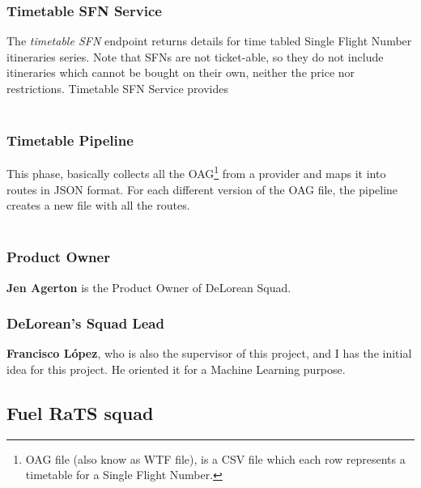 \subsubsection{Timetable SFN Service} \label{timetable_sfn_service}

The \textit{timetable SFN} endpoint returns details for time tabled Single Flight Number itineraries series. Note that SFNs are not ticket-able, so they do not include itineraries which cannot be bought on their own, neither the price nor restrictions.
Timetable SFN Service provides 
\\\\

\subsubsection{Timetable Pipeline} \label{timetable_pipeline}

This phase, basically collects all the OAG\footnote{OAG file (also know as WTF file), is a CSV\cite{csv} file which each row represents a timetable for a Single Flight Number.} from a provider and maps it into routes in JSON\cite{json} format. For each different version of the OAG file, the pipeline creates a new file with all the routes.
\\\\

\subsubsection{Product Owner} \label{product_owner}

\textbf{Jen Agerton} is the Product Owner of DeLorean Squad.

\subsubsection{DeLorean's Squad Lead}

\textbf{Francisco López}, who is also the supervisor of this project, and I has the initial idea for this project. He oriented it for a Machine Learning purpose.

\subsection{Fuel RaTS squad}

